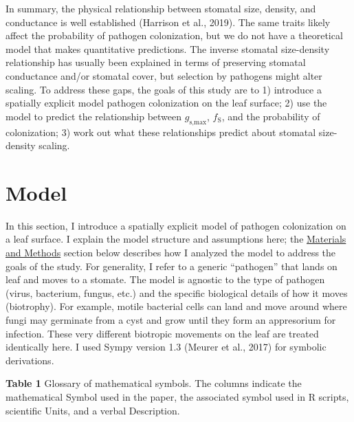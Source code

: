 \documentclass[utf8]{frontiersSCNS}
\newcommand{\fs}{$f_\text{S}$}
\newcommand{\gsmax}{$g_\text{s,max}$}
\begin{document}
In summary, the physical relationship between stomatal size, density,
and conductance is well established (Harrison et al., 2019). The same
traits likely affect the probability of pathogen colonization, but we do
not have a theoretical model that makes quantitative predictions. The
inverse stomatal size-density relationship has usually been explained in
terms of preserving stomatal conductance and/or stomatal cover, but
selection by pathogens might alter scaling. To address these gaps, the
goals of this study are to 1) introduce a spatially explicit model
pathogen colonization on the leaf surface; 2) use the model to predict
the relationship between \gsmax, \fs{}, and the probability of
colonization; 3) work out what these relationships predict about
stomatal size-density scaling.

\hypertarget{model}{%
\section*{Model}\label{model}}

In this section, I introduce a spatially explicit model of pathogen
colonization on a leaf surface. I explain the model structure and
assumptions here; the
\protect\hyperlink{materials-and-methods}{Materials and Methods} section
below describes how I analyzed the model to address the goals of the
study. For generality, I refer to a generic ``pathogen'' that lands on
leaf and moves to a stomate. The model is agnostic to the type of
pathogen (virus, bacterium, fungus, etc.) and the specific biological
details of how it moves (biotrophy). For example, motile bacterial cells
can land and move around where fungi may germinate from a cyst and grow
until they form an appresorium for infection. These very different
biotropic movements on the leaf are treated identically here. I used
Sympy version 1.3 (Meurer et al., 2017) for symbolic derivations.

\textbf{Table 1} \textbar{} Glossary of mathematical symbols. The
columns indicate the mathematical Symbol used in the paper, the
associated symbol used in R scripts, scientific Units, and a verbal
Description.
\end{document}
